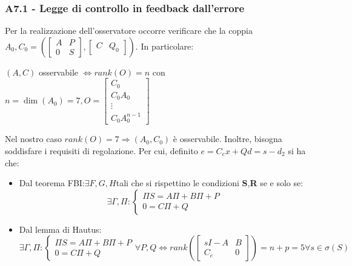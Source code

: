 \documentclass{beamer}
\begin{document}
\begin{frame}
	\frametitle{A7.1 - Legge di controllo in feedback dall'errore }%
	Per la realizzazione dell'osservatore occorre verificare che la coppia \(A_{0},C_{0}=\left(\begin{bmatrix}
		A&P\\0&S
	\end{bmatrix},\begin{bmatrix}
		C&Q_{0}
	\end{bmatrix}\right)\). In particolare:
	\begin{block}{}
		\begin{center}
			\((A,C)\) osservabile \(\Longleftrightarrow rank(O)=n\) con \(n=\dim{(A_{0})}=7,O=\begin{bmatrix}
				C_{0}\\C_{0}A_{0}\\\vdots \\C_{0}A_{0}^{n-1}
			\end{bmatrix}\)
		\end{center}
	\end{block}
	Nel nostro caso \(rank(O)=7\Rightarrow (A_{0},C_{0})\) è osservabile. Inoltre, bisogna soddisfare i requisiti di regolazione. Per cui, definito \(e=C_{e}x+Qd=s-d_{2}\) si ha che:
	\begin{itemize}
		\item Dal teorema FBI:\(\exists{F,G,H}\)tali che si rispettino le condizioni \textbf{S},\textbf{R} se e solo se:\begin{equation*}
			\exists{\Gamma,\Pi}:\begin{cases}
				\Pi S= A\Pi +B\Pi+P\\
				 0=C\Pi+Q
			\end{cases}
		\end{equation*}
		\item Dal lemma di Hautus:\begin{equation*}
			\exists{\Gamma,\Pi}:\begin{cases}
				\Pi S= A\Pi +B\Pi+P\\
				 0=C\Pi+Q
			\end{cases}\forall P,Q\Longleftrightarrow rank\left(\begin{bmatrix}
				sI-A&B\\C_{e}&0
			\end{bmatrix}\right)=n+p=5\forall s\in\sigma(S)
		\end{equation*}
	\end{itemize}
\end{frame}
\end{document}
